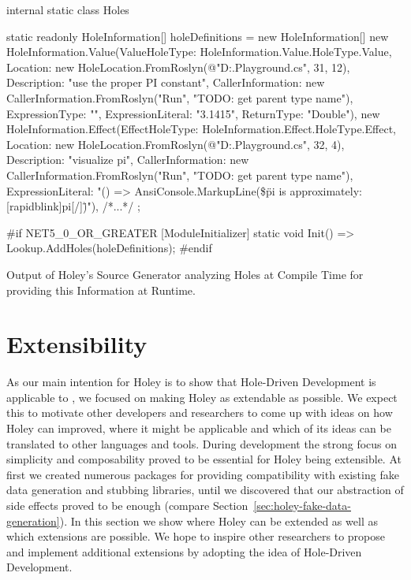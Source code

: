 \begin{program}[ht]
\begin{CsCode}
internal static class Holes
{
    static readonly HoleInformation[] holeDefinitions = new HoleInformation[]
    {
        new HoleInformation.Value(ValueHoleType: HoleInformation.Value.HoleType.Value, Location: new HoleLocation.FromRoslyn(@"D:\code\holey\dotnet\src\Holey.Playground\HoleTypesExample.cs", 31, 12), Description: "use the proper PI constant", CallerInformation: new CallerInformation.FromRoslyn("Run", "TODO: get parent type name"), ExpressionType: "", ExpressionLiteral: "3.1415", ReturnType: "Double"),
        new HoleInformation.Effect(EffectHoleType: HoleInformation.Effect.HoleType.Effect, Location: new HoleLocation.FromRoslyn(@"D:\code\holey\dotnet\src\Holey.Playground\HoleTypesExample.cs", 32, 4), Description: "visualize pi", CallerInformation: new CallerInformation.FromRoslyn("Run", "TODO: get parent type name"), ExpressionLiteral: "() => AnsiConsole.MarkupLine(\$\"pi is approximately: [rapidblink]{pi}[/]\")"),
        /*...*/
    };

#if NET5_0_OR_GREATER
    [ModuleInitializer]
    static void Init() => Lookup.AddHoles(holeDefinitions);
#endif
}
\end{CsCode}
\caption{Output of Holey's Source Generator analyzing Holes at Compile Time for providing this Information at Runtime.}
\label{prg:holey-source-generators}
\end{program}

\section{Extensibility}
\label{sec:holey-extensibility}
As our main intention for Holey is to show that Hole-Driven Development is applicable to \CS, we focused on making Holey as extendable as possible.
We expect this to motivate other developers and researchers to come up with ideas on how Holey can improved, where it might be applicable and which of its ideas can be translated to other languages and tools.
During development the strong focus on simplicity and composability proved to be essential for Holey being extensible.
At first we created numerous packages for providing compatibility with existing fake data generation and stubbing libraries, until we discovered that our abstraction of side effects proved to be enough (compare Section~\ref{sec:holey-fake-data-generation}).
In this section we show where Holey can be extended as well as which extensions are possible.
We hope to inspire other researchers to propose and implement additional extensions by adopting the idea of Hole-Driven Development.

